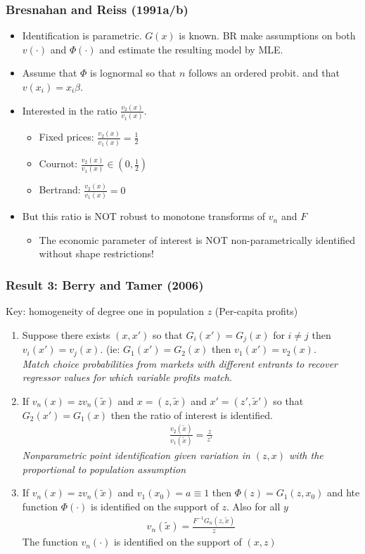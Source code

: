\begin{frame}
\frametitle{Bresnahan and Reiss (1991a/b)}
\small
\begin{itemize}
\item Identification is parametric. $G(x)$ is known. BR make assumptions on both $v(\cdot)$ and $\Phi(\cdot)$ and estimate the resulting model by MLE.
\item Assume that $\Phi$ is lognormal so that $n$ follows an ordered probit. and that $v(x_i) = x_i \beta$.
\item Interested in the ratio $\frac{v_2(x)}{v_1(x)}$.
\begin{itemize}
\item Fixed prices: $\frac{v_2(x)}{v_1(x)} = \frac{1}{2}$
\item Cournot: $\frac{v_2(x)}{v_1(x)} \in (0, \frac{1}{2})$
\item Bertrand: $\frac{v_2(x)}{v_1(x)} =0$
\end{itemize}
\item But this ratio is NOT robust to monotone transforms of $v_n$ and $F$
\begin{itemize}
\item The economic parameter of interest is NOT non-parametrically identified without shape restrictions!
\end{itemize}
\end{itemize}
\end{frame}


\begin{frame}
\frametitle{Result 3: Berry and Tamer (2006)}
\footnotesize
Key: homogeneity of degree one in population $z$ (Per-capita profits)
\begin{enumerate}
\item Suppose there exists $(x,x')$ so that $G_i(x') = G_j(x)$ for $i \neq j$ then $v_i(x') = v_j(x)$. (ie: $G_1(x') = G_2(x)$ then $v_1(x') = v_2(x)$.\\
\textit{Match choice probabilities from markets with different entrants to recover regressor values for which variable profits match}.
\item If $v_n(x) = z v_n(\tilde{x})$ and $x = (z,\tilde{x})$ and $x' = (z',\tilde{x}')$ so that $G_2(x') = G_1(x)$ then the ratio of interest is identified.
\begin{eqnarray*}
\frac{v_2(\tilde{x})} {v_1(\tilde{x})}  = \frac{z}{z'}
\end{eqnarray*}
\textit{Nonparametric point identification given variation in $(z,x)$ with the proportional to population assumption}
\item If $v_n(x) = z v_n(\tilde{x})$ and $v_1(x_0) = a \equiv 1$ then $\Phi(z) = G_1(z,x_0)$ and hte function $\Phi(\cdot)$ is identified on the support of $z$. Also for all $y$ 
\begin{eqnarray*}
v_n(\tilde{x}) = \frac{F^{-1}G_n(z,\tilde{x})}{z}
\end{eqnarray*}
The function $v_n(\cdot)$ is identified on the support of $(x,z)$
\end{enumerate}
\end{frame}

